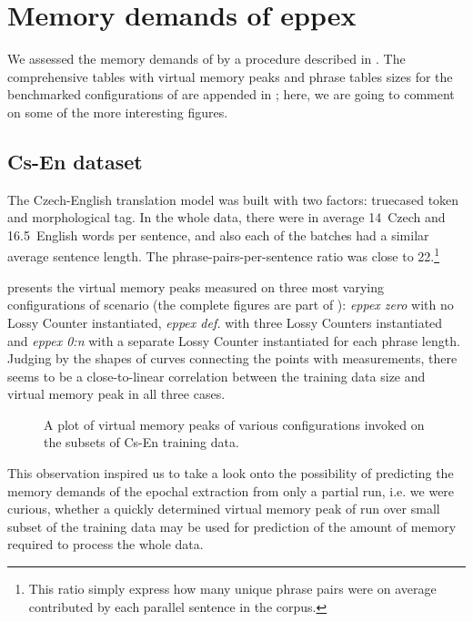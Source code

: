 \section{Memory demands of eppex}
\label{sec:eppex-memory-demands}

We assessed the memory demands of \eppex{} by a procedure described in .
The comprehensive tables with virtual memory peaks and phrase tables sizes for the benchmarked
configurations of \eppex{} are appended in ; here, we are going
to comment on some of the more interesting figures.

\subsection{Cs-En dataset}

The Czech-English translation model was built with two factors: truecased token and
morphological tag.
In the whole data, there were in average 14~Czech and 16.5~English words per sentence,
and also each of the batches had a similar average sentence length.
The phrase-pairs-per-sentence ratio was close to 22.\footnote{This ratio simply express
how many unique phrase pairs were on average contributed by each parallel sentence in
the corpus.}

 presents the virtual memory peaks measured on three most varying
configurations of \eppex{} scenario (the complete figures are part of ):
\emph{eppex zero} with no Lossy Counter instantiated,
\emph{eppex def.} with three Lossy Counters instantiated and \emph{eppex 0:n} with
a separate Lossy Counter instantiated for each phrase length.
Judging by the shapes of curves connecting the points with measurements, there seems to be
a close-to-linear correlation between the training data size and virtual memory peak in all
three cases.

\begin{figure}[!htb]
  \centering
  
  \caption{
    A plot of virtual memory peaks of various \eppex{} configurations invoked on the subsets of Cs-En training data.
  }
  \label{fig:cs-en-vm-peaks}
\end{figure}

This observation inspired us to take a look onto the possibility of predicting the memory
demands of the epochal extraction from only a partial run, i.e. we were curious,
whether a quickly determined virtual memory peak of run over small subset of the training data
may be used for prediction of the amount of memory required to process the whole data.

